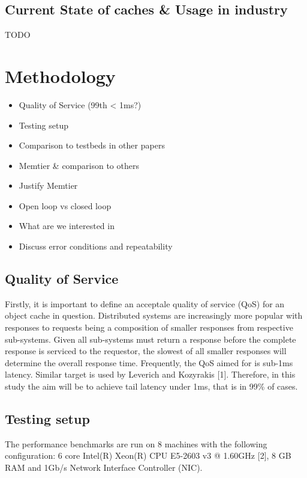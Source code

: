 \subsection{Current State of caches \& Usage in
industry}\label{current-state-of-caches-usage-in-industry}

TODO

\section{Methodology}\label{methodology}

\begin{itemize}
\tightlist
\item
  Quality of Service (99th \textless{} 1ms?)
\item
  Testing setup
\item
  Comparison to testbeds in other papers
\item
  Memtier \& comparison to others
\item
  Justify Memtier
\item
  Open loop vs closed loop
\item
  What are we interested in
\item
  Discuss error conditions and repeatability
\end{itemize}

\subsection{Quality of Service}\label{quality-of-service}

Firstly, it is important to define an acceptale quality of service (QoS)
for an object cache in question. Distributed systems are increasingly
more popular with responses to requests being a composition of smaller
responses from respective sub-systems. Given all sub-systems must return
a response before the complete response is serviced to the requestor,
the slowest of all smaller responses will determine the overall response
time. Frequently, the QoS aimed for is sub-1ms latency. Similar target
is used by Leverich and Kozyrakis {[}1{]}. Therefore, in this study the
aim will be to achieve tail latency under 1ms, that is in 99\% of cases.

\subsection{Testing setup}\label{testing-setup}

The performance benchmarks are run on 8 machines with the following
configuration: 6 core Intel(R) Xeon(R) CPU E5-2603 v3 @ 1.60GHz {[}2{]},
8 GB RAM and 1Gb/s Network Interface Controller (NIC).

